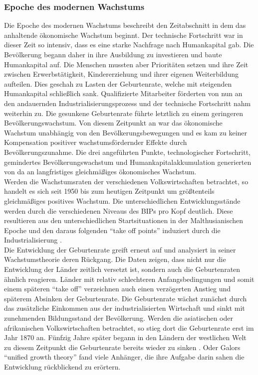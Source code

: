 \subsubsection*{Epoche des modernen Wachstums}
%
Die Epoche des modernen Wachstums beschreibt den Zeitabschnitt in dem das anhaltende ökonomische Wachstum beginnt. Der technische Fortschritt war in dieser Zeit so intensiv, dass es eine starke Nachfrage nach Humankapital gab. Die Bevölkerung begann daher in ihre Ausbildung zu investieren und baute Humankapital auf. Die Menschen mussten aber Prioritäten setzen und ihre Zeit zwischen Erwerbstätigkeit, Kindererziehung und ihrer eigenen Weiterbildung aufteilen. Dies geschah zu Lasten der Geburtenrate, welche mit steigenden Humankapital schließlich sank. Qualifizierte Mitarbeiter förderten von nun an den andauernden Industrialisierungsprozess und der technische Fortschritt nahm weiterhin zu. Die gesunkene Geburtenrate führte letztlich zu einem geringeren Bevölkerungswachstum. Von diesem Zeitpunkt an war das ökonomische Wachstum unabhängig von den Bevölkerungsbewegungen und es kam zu keiner Kompensation positiver wachstumsfördernder Effekte durch Bevölkerungszunahme. Die drei angeführten Punkte, technologischer Fortschritt, gemindertes Bevölkerungswachstum und Humankapitalakkumulation generierten von da an langfristiges gleichmäßiges ökonomisches Wachstum. \\ Werden die Wachstumsraten der verschiedenen Volkswirtschaften betrachtet, so handelt es sich seit 1950 bis zum heutigen Zeitpunkt um größtenteils gleichmäßiges positives Wachstum. Die unterschiedlichen Entwicklungsstände werden durch die verschiedenen Niveaus des BIPs pro Kopf deutlich. Diese resultieren aus den unterschiedlichen Startsituationen in der Malthusianischen Epoche und den daraus folgenden "`take off points"' induziert durch die Industrialisierung \cite{Galor.2014}.\\
%
Die Entwicklung der Geburtenrate greift \cite{Galor.2014} erneut auf und analysiert in seiner Wachstumstheorie deren Rückgang. Die Daten zeigen, dass nicht nur die Entwicklung der Länder zeitlich versetzt ist, sondern auch die Geburtenraten ähnlich reagieren. Länder mit relativ schlechteren Anfangsbedingungen und somit einem späteren "`take off"' verzeichnen auch einen verzögerten Anstieg und späterem Absinken der Geburtenrate. Die Geburtenrate wächst zunächst durch das zusätzliche Einkommen aus der industrialisierten Wirtschaft und sinkt mit zunehmenden Bildungsstand der Bevölkerung. Werden die asiatischen oder afrikanischen Volkswirtschaften betrachtet, so stieg dort die Geburtenrate erst im Jahr 1870 an. Fünfzig Jahre später begann in den Ländern der westlichen Welt zu diesem Zeitpunkt die Geburtenrate bereits wieder zu sinken \cite{Galor.2014}. Oder Galors "`unified growth theory"' fand viele Anhänger, die ihre Aufgabe darin sahen die Entwicklung rückblickend zu erörtern.\\
